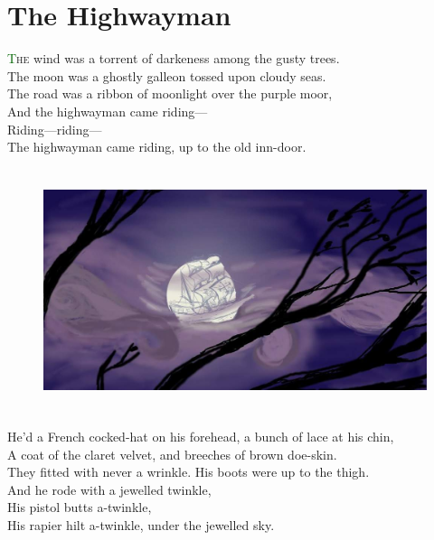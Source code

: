 \documentclass[oneside,12pt,english]{book}
\newcommand*\initfamily{\usefont{U}{Acorn}{xl}{n}}
\begin{document}
\begin{titlepage}
  
  \thispagestyle{empty}
\end{titlepage}


\newpage
\setcounter{page}{3}

\section*{The Highwayman}

\Large
\lettrine[lines=3]{\initfamily\textcolor{darkgreen}{T}}{he} wind was a torrent
of darkeness among the gusty trees.\\
The moon was a ghostly galleon tossed upon cloudy seas.\\
The road was a ribbon of moonlight over the purple moor,\\
And the highwayman came riding---\\
Riding---riding---\\
The highwayman came riding, up to the old inn-door.

\begin{figure}[H]
\centering
\includegraphics[height=2.8in]{fig-01.jpg}
\end{figure}


He’d a French cocked-hat on his forehead, a bunch of lace at his chin,\\
A coat of the claret velvet, and breeches of brown doe-skin.\\
They fitted with never a wrinkle. His boots were up to the thigh.\\
And he rode with a jewelled twinkle,\\
His pistol butts a-twinkle,\\
His rapier hilt a-twinkle, under the jewelled sky.
\end{document}
